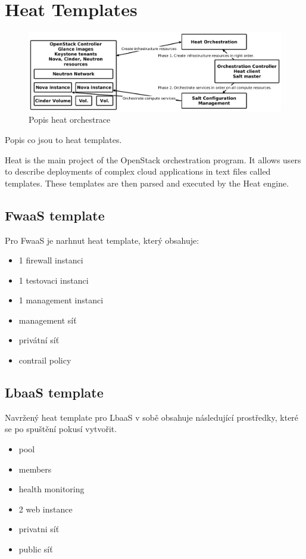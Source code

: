 \section{Heat Templates}

\begin{figure}[h]
\begin{centering}
\includegraphics[scale=0.21]{images/heat}
\par\end{centering}
\caption{Popis heat orchestrace\label{fig:heat}}
\end{figure}

Popis co jsou to heat templates.

Heat is the main project of the OpenStack orchestration program. It allows users to describe deployments of complex cloud applications in text files called templates. These templates are then parsed and executed by the Heat engine.

\subsection{FwaaS template}

Pro FwaaS je narhnut heat template, který obsahuje:

\begin{itemize}
\item 1 firewall instanci
\item 1 testovaci instanci
\item 1 management instanci
\item management síť
\item privátní síť
\item contrail policy
\end{itemize}

\subsection{LbaaS template}

Navržený heat template pro LbaaS v sobě obsahuje následující prostředky, které se po spuštění pokusí vytvořit.

\begin{itemize}
\item pool
\item members
\item health monitoring
\item 2 web instance
\item privatni síť
\item public síť
\end{itemize}
